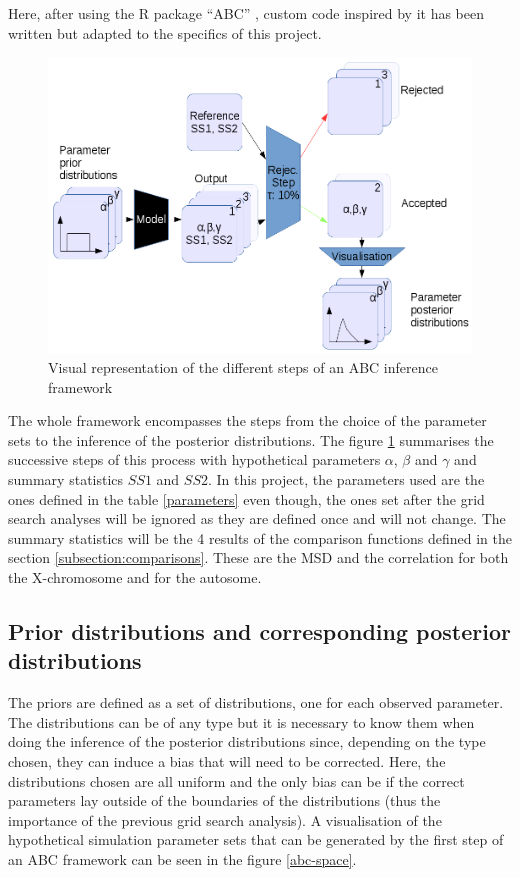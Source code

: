 \documentclass[a4paper,12pt]{report}
\begin{document}
Here, after using the R package “ABC” \cite{Csi01}, custom code inspired by it has been written but adapted to the specifics of this project.

\begin{figure}[!htbp]
	\hspace*{-1cm}
	\includegraphics[scale=0.6]{../data/abc-landscape.png}
	\caption{Visual representation of the different steps of an ABC inference framework}
	\label{abc}
\end{figure}

The whole framework encompasses the steps from the choice of the parameter sets to the inference of the posterior distributions. The figure \ref{abc} summarises the successive steps of this process with hypothetical parameters $\alpha$, $\beta$ and $\gamma$ and summary statistics $SS1$ and $SS2$. In this project, the parameters used are the ones defined in the table \ref{parameters} even though, the ones set after the grid search analyses will be ignored as they are defined once and will not change. The summary statistics will be the 4 results of the comparison functions defined in the section \ref{subsection:comparisons}. These are the MSD and the correlation for both the X-chromosome and for the autosome.

\subsection{Prior distributions and corresponding posterior distributions}
The priors are defined as a set of distributions, one for each observed parameter. The distributions can be of any type but it is necessary to know them when doing the inference of the posterior distributions since, depending on the type chosen, they can induce a bias that will need to be corrected. Here, the distributions chosen are all uniform and the only bias can be if the correct parameters lay outside of the boundaries of the distributions (thus the importance of the previous grid search analysis). A visualisation of the hypothetical simulation parameter sets that can be generated by the first step of an ABC framework can be seen in the figure \ref{abc-space}.
\end{document}

